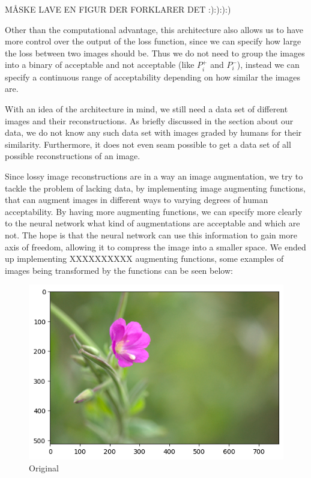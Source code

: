 MÅSKE LAVE EN FIGUR DER FORKLARER DET :):):):)

Other than the computational advantage, this architecture also allows us to have more control over the output of the loss function, since we can specify how large the loss between two images should be. Thus we do not need to group the images into a binary of acceptable and not acceptable (like $P_i^+$ and $P_i^-$), instead we can specify a continuous range of acceptability depending on how similar the images are.


With an idea of the architecture in mind, we still need a data set of different images and their reconstructions. As briefly discussed in the section about our data, we do not know any such data set with images graded by humans for their similarity. Furthermore, it does not even seam possible to get a data set of all possible reconstructions of an image. 

Since lossy image reconstructions are in a way an image augmentation, we try to tackle the problem of lacking data, by implementing image augmenting functions, that can augment images in different ways to varying degrees of human acceptability.
By having more augmenting functions, we can specify more clearly to the neural network what kind of augmentations are acceptable and which are not. The hope is that the neural network can use this information to gain more axis of freedom, allowing it to compress the image into a smaller space. We ended up implementing XXXXXXXXXX augmenting functions, some examples of images being transformed by the functions can be seen below:

\begin{figure}[H]
    \centering
    \includegraphics[width=0.80\linewidth,origin=c]{Report/Pictures/LossFuntion/Original.png}
    \caption{Original}
    \label{Original}
\end{figure}

